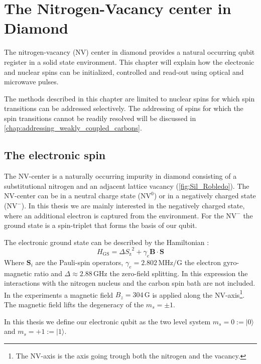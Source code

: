 \chapter{The Nitrogen-Vacancy center in Diamond}
The nitrogen-vacancy (NV) center in diamond provides a natural occurring qubit register in a solid state environment.
This chapter will explain how the electronic and nuclear spins can be initialized, controlled and read-out using optical and microwave pulses.

The methods described in this chapter are limited to nuclear spins for which spin transitions can be addressed selectively.
The addressing of spins for which the spin transitions cannot be readily resolved will be discussed in \cref{chap:addressing_weakly_coupled_carbons}.

\section{The electronic spin}
The NV-center is a naturally occurring impurity in diamond consisting of a substitutional nitrogen and an adjacent lattice vacancy (\cref{fig:Sil_Robledo}).
The NV-center can be in a neutral charge state ($\mathrm{NV}^0$) or in a negatively charged state ($\mathrm{NV}^-$).
In this thesis we are mainly interested in the negatively charged state, where an additional electron is captured from the environment.
For the $\mathrm{NV}^-$ the ground state is a spin-triplet that forms the basis of our qubit.

The electronic ground state can be described by the Hamiltonian \citep{Bernien2014Control}:
 \begin{equation}
H_\mathrm{GS} = \Delta {{S}_\mathrm{z}}^2 + \gamma_e \bm{B} \cdot \bm{S}
\end{equation}
Where $\bm{S}_i$ are the Pauli-spin operators,  $\gamma_e  = 2.802\,\mathrm{ MHz/G}$  the electron gyro-magnetic ratio and $\Delta \approx 2.88\, \mathrm{GHz}$ the zero-field splitting.
In this expression the interactions with the nitrogen nucleus and the carbon spin bath are not included.
In the experiments a magnetic field $B_z = 304\,\mathrm{G}$ is applied along the NV-axis\footnote{The NV-axis is the axis going trough both the nitrogen and the vacancy. }.
The magnetic field lifts the degeneracy of the $m_s = \pm 1$.

In this thesis we define our electronic qubit  as the two level system  $m_s=0:=|0\rangle$ and $m_s = +1 := |1\rangle$.

